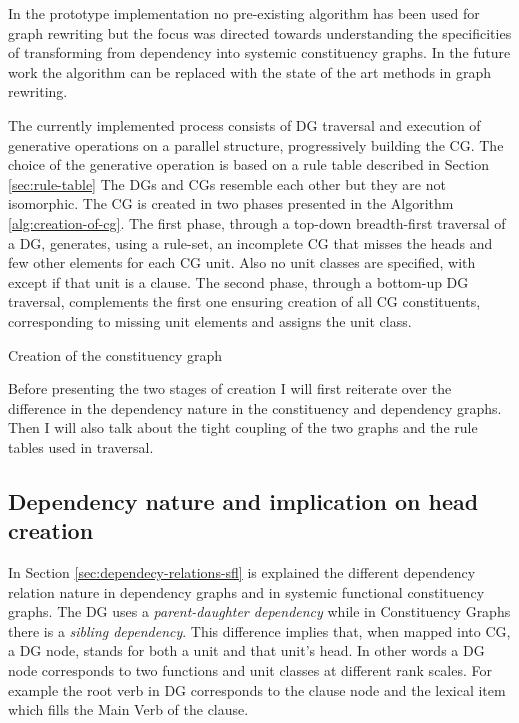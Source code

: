 In the prototype implementation no pre-existing algorithm has been used for graph rewriting but the focus was directed towards understanding the specificities of transforming from dependency into systemic constituency graphs. In the future work the algorithm can be replaced with the state of the art methods in graph rewriting. 
 
The currently implemented process consists of DG traversal and execution of generative operations on a parallel structure, progressively building the CG. The choice of the generative operation is based on a rule table described in Section \ref{sec:rule-table} The DGs and CGs resemble each other but they are not isomorphic. The CG is created in two phases presented in the Algorithm \ref{alg:creation-of-cg}. The first phase, through a top-down breadth-first traversal of a DG, generates, using a rule-set, an incomplete CG that misses the heads and few other elements for each CG unit. Also no unit classes are specified, with except if that unit is a clause. The second phase, through a bottom-up DG traversal, complements the first one ensuring creation of all CG constituents, corresponding to missing unit elements and assigns the unit class. 

\begin{algorithm}[!ht]
	\caption{Creation of the constituency graph}
	\label{alg:creation-of-cg}
\end{algorithm}

Before presenting the two stages of creation I will first reiterate over the difference in the dependency nature in the constituency and dependency graphs. Then I will also talk about the tight coupling of the two graphs and the rule tables used in traversal. 

\subsection{Dependency nature and implication on head creation}
\label{sec:dep-implications}
In Section \ref{sec:dependecy-relations-sfl} is explained the different dependency relation nature in dependency graphs and in systemic functional constituency graphs. The DG uses a \textit{parent-daughter dependency} while in Constituency Graphs there is a \textit{sibling dependency}. This difference implies that, when mapped into CG, a DG node, stands for both a unit and that unit's head. In other words a DG node corresponds to two functions and unit classes at different rank scales. For example the root verb in DG corresponds to the clause node and the lexical item which fills the Main Verb of the clause. 


